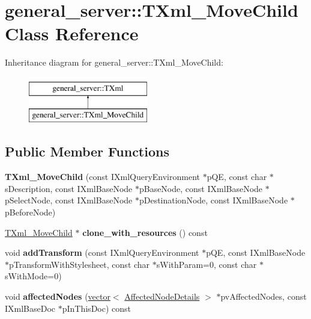 \hypertarget{classgeneral__server_1_1TXml__MoveChild}{\section{general\-\_\-server\-:\-:\-T\-Xml\-\_\-\-Move\-Child \-Class \-Reference}
\label{classgeneral__server_1_1TXml__MoveChild}
}
\-Inheritance diagram for general\-\_\-server\-:\-:\-T\-Xml\-\_\-\-Move\-Child\-:\begin{figure}[H]
\begin{center}
\leavevmode
\includegraphics[height=2.000000cm]{classgeneral__server_1_1TXml__MoveChild}
\end{center}
\end{figure}
\subsection*{\-Public \-Member \-Functions}
\begin{DoxyCompactItemize}
\item 
\hypertarget{classgeneral__server_1_1TXml__MoveChild_abb920b2dba0478a5e0f505a89dd6fad2}{{\bfseries \-T\-Xml\-\_\-\-Move\-Child} (const \-I\-Xml\-Query\-Environment $\ast$p\-Q\-E, const char $\ast$s\-Description, const \-I\-Xml\-Base\-Node $\ast$p\-Base\-Node, const \-I\-Xml\-Base\-Node $\ast$p\-Select\-Node, const \-I\-Xml\-Base\-Node $\ast$p\-Destination\-Node, const \-I\-Xml\-Base\-Node $\ast$p\-Before\-Node)}\label{classgeneral__server_1_1TXml__MoveChild_abb920b2dba0478a5e0f505a89dd6fad2}

\item 
\hypertarget{classgeneral__server_1_1TXml__MoveChild_a72e339bbb79d26933f7b886b2e7093c3}{\hyperlink{classgeneral__server_1_1TXml__MoveChild}{\-T\-Xml\-\_\-\-Move\-Child} $\ast$ {\bfseries clone\-\_\-with\-\_\-resources} () const }\label{classgeneral__server_1_1TXml__MoveChild_a72e339bbb79d26933f7b886b2e7093c3}

\item 
\hypertarget{classgeneral__server_1_1TXml__MoveChild_a5e6740f0a11592d75e48c6928c6df363}{void {\bfseries add\-Transform} (const \-I\-Xml\-Query\-Environment $\ast$p\-Q\-E, const \-I\-Xml\-Base\-Node $\ast$p\-Transform\-With\-Stylesheet, const char $\ast$s\-With\-Param=0, const char $\ast$s\-With\-Mode=0)}\label{classgeneral__server_1_1TXml__MoveChild_a5e6740f0a11592d75e48c6928c6df363}

\item 
\hypertarget{classgeneral__server_1_1TXml__MoveChild_a8a373c80c720831c80a57ba9a2f7e8f8}{void {\bfseries affected\-Nodes} (\hyperlink{classvector}{vector}$<$ \hyperlink{structgeneral__server_1_1TXml_1_1AffectedNodeDetails}{\-Affected\-Node\-Details} $>$ $\ast$pv\-Affected\-Nodes, const \-I\-Xml\-Base\-Doc $\ast$p\-In\-This\-Doc) const }\label{classgeneral__server_1_1TXml__MoveChild_a8a373c80c720831c80a57ba9a2f7e8f8}

\end{DoxyCompactItemize}
